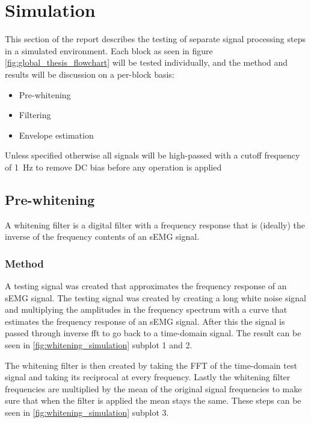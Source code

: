 \chapter{Simulation}
This section of the report describes the testing of separate signal processing steps in a simulated environment. Each block as seen in figure \ref{fig:global_thesis_flowchart} will be tested individually, and the method and results will be discussion on a per-block basis:
\begin{itemize}
    \item Pre-whitening
    \item Filtering
    \item Envelope estimation
\end{itemize}

Unless specified otherwise all signals will be high-passed with a cutoff frequency of \SI{1}{\hertz} to remove DC bias before any operation is applied

\section{Pre-whitening}\label{sec:whitening}
A whitening filter is a digital filter with a frequency response that is (ideally) the inverse of the frequency contents of an sEMG signal. 

\subsection{Method}
A testing signal was created that approximates the frequency response of an sEMG signal. The testing signal was created by creating a long white noise signal and multiplying the amplitudes in the frequency spectrum with a curve that estimates the frequency response of an sEMG signal. After this the signal is passed through inverse fft to go back to a time-domain signal. The result can be seen in \ref{fig:whitening_simulation} subplot 1 and 2.

The whitening filter is then created by taking the FFT of the time-domain test signal and taking its reciprocal at every frequency. Lastly the whitening filter frequencies are multiplied by the mean of the original signal frequencies to make sure that when the filter is applied the mean stays the same. These steps can be seen in \ref{fig:whitening_simulation} subplot 3. 

